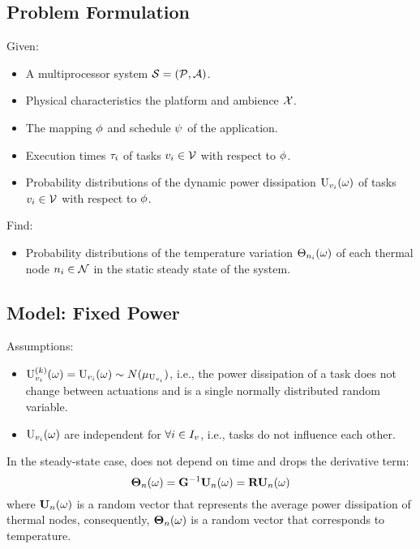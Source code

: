 \subsection{Problem Formulation}
Given:
\begin{itemize}
  \item A multiprocessor system $\mathcal{S} = (\mathcal{P}, \mathcal{A})$.
  \item Physical characteristics the platform and ambience $\mathcal{X}$.
  \item The mapping $\phi$ and schedule $\psi$ of the application.
  \item Execution times $\tau_i$ of tasks $v_i \in \mathcal{V}$ with respect to $\phi$.
  \item Probability distributions of the dynamic power dissipation $\textrm{U}_{v_i}(\omega)$ of tasks $v_i \in \mathcal{V}$ with respect to $\phi$.
\end{itemize}

Find:
\begin{itemize}
  \item Probability distributions of the temperature variation $\Theta_{n_i}(\omega)$ of each thermal node $n_i \in \mathcal{N}$ in the static steady state of the system.
\end{itemize}

\subsection{Model: Fixed Power} 
Assumptions:
\begin{itemize}
  \item $\textrm{U}^{(k)}_{v_i}(\omega) = \textrm{U}_{v_i}(\omega) \sim N(\mu_{\textrm{U}_{v_i}})$, i.e., the power dissipation of a task does not change between actuations and is a single normally distributed random variable.
  \item $\textrm{U}_{v_i}(\omega)$ are independent for $\forall i \in I_v$, i.e., tasks do not influence each other.
\end{itemize}

In the steady-state case,  does not depend on time and drops the derivative term:
\[
  \mathbf{\Theta}_n(\omega) = \mathbf{G}^{-1} \mathbf{U}_n(\omega) = \mathbf{R} \mathbf{U}_n(\omega)
\]
where $\mathbf{U}_n(\omega)$ is a random vector that represents the average power dissipation of thermal nodes, consequently, $\mathbf{\Theta}_n(\omega)$ is a random vector that corresponds to temperature.

